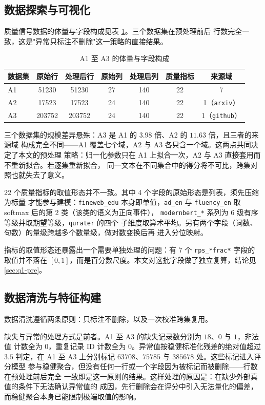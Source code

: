 \documentclass[bwprint]{gmcmthesis}
\numberwithin{equation}{section}
\numberwithin{figure}{section}
\numberwithin{table}{section}
\begin{document}
\subsection{数据探索与可视化}

质量信号数据的体量与字段构成见表 \ref{tab:data-overview}。三个数据集在预处理前后
行数完全一致，这是"异常只标注不删除"这一策略的直接结果。

\begin{table}[htp!]
\centering
\renewcommand\arraystretch{1.2}
\caption{A1 至 A3 的体量与字段构成}\label{tab:data-overview}
\begin{tabular*}{\textwidth}{@{\extracolsep{\fill}}lcccccc@{}}
\toprule
数据集 & 原始行 & 处理后行 & 原始列 & 处理后列 & 质量指标 & 来源域 \\
\midrule
A1 & 51230  & 51230  & 27 & 140 & 22 & 7 \\
A2 & 17523  & 17523  & 24 & 140 & 22 & 1（\texttt{arxiv}） \\
A3 & 203752 & 203752 & 24 & 140 & 22 & 1（\texttt{github}） \\
\bottomrule
\end{tabular*}
\end{table}

三个数据集的规模差异悬殊：A3 是 A1 的 $3.98$ 倍、A2 的 $11.63$ 倍，且三者的来源域
构成完全不同——A1 覆盖七个域，A2 与 A3 各只含一个域。这两点共同决定了本文的预处理
策略：归一化参数只在 A1 上拟合一次，A2 与 A3 直接套用而不重新拟合。若逐集重新拟合，
同一文本在不同集合中的得分将不可比，跨集对照也就失去了意义。

22 个质量指标的取值形态并不一致。其中 4 个字段的原始形态是列表，须先压缩为标量
才能参与建模：\texttt{fineweb\_edu} 本身即单值，\texttt{ad\_en} 与
\texttt{fluency\_en} 取 softmax 后的第 2 类（该类的语义为正向事件），
\texttt{modernbert\_*} 系列为 6 级有序等级并取期望等级，\texttt{qurater} 的四个
子维度取算术平均。另有两个字段（词数、句数）的量级跨越多个数量级，做对数变换后再
进入分位映射。

指标的取值形态还暴露出一个需要单独处理的问题：有 7 个 \texttt{rps\_*frac*} 字段的
取值并不落在 $[0,1]$，而是百分数尺度。本文对这批字段做了独立复算，结论见
\ref{sec:q1-pre}。

\subsection{数据清洗与特征构建}

数据清洗遵循两条原则：只标注不删除，以及一次校准跨集复用。

缺失与异常的处理方式是前者。A1 至 A3 的缺失记录数分别为 $18$、$0$ 与 $1$，非法值
计数全为 $0$，重复记录 ID 计数全为 $0$。异常值按稳健标准化残差的绝对值超过 $3.5$
判定，在 A1 至 A3 上分别标记 $63708$、$75785$ 与 $385678$ 处。这些标记进入评分模型
参与稳健聚合，但没有任何一行或一个字段因为被标记而被删除——行数在预处理前后完全
一致即是这一原则的结果。这样处理的原因是：在缺少外部真值的条件下无法确认异常值的
成因，先行删除会在评分中引入无法量化的偏差，而稳健聚合本身已能限制极端取值的影响。
\end{document}
